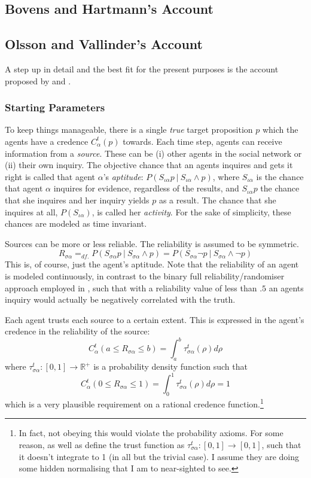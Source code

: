 \documentclass[11pt, a4paper]{scrartcl}
\newcommand{\Ssa}{S_{\sigma\alpha}}
\newcommand{\sa}{{\sigma\alpha}}
\newcommand{\given}[1][]{\:#1\vert\:}
\renewcommand{\i}[1]{\emph{#1}}
\begin{document}
\subsection{Bovens and Hartmann's Account}


\subsection{Olsson and Vallinder's Account}

A step up in detail and the best fit for the present purposes is the account proposed by \textcite{Olsson2013} and \textcite{Angere2010}.

\subsubsection{Starting Parameters}

To keep things manageable, there is a single \i{true} target proposition $p$ which the agents have a credence $C^t_\alpha(p)$ towards. Each time step, agents can receive information from a \i{source}. These can be (i) other agents in the social network or (ii) their own inquiry. The objective chance that an agents inquires and gets it right is called that agent $\alpha$'s \i{aptitude}: $P(S_{\iota \alpha}p \given S_{\iota \alpha} \land p)$, where $S_{\iota \alpha}$ is the chance that agent $\alpha$ inquires for evidence, regardless of the results, and $S_{\iota \alpha} p$ the chance that she inquires and her inquiry yields $p$ as a result. The chance that she inquires at all, $P(S_{\iota \alpha})$, is called her \i{activity}. For the sake of simplicity, these chances are modeled as time invariant.

Sources can be more or less reliable. The reliability is assumed to be symmetric.
\[ 
R_{\sigma \alpha} =_{df.} P(\Ssa p \given \Ssa \land p) = P(\Ssa \neg p \given \Ssa \land \neg p)
\]
This is, of course, just the agent's aptitude. Note that the reliability of an agent is modeled continuously, in contrast to the binary full reliability/randomiser approach employed in \textcite[Chp. 3]{Bovens2003}, such that with a reliability value of less than $.5$ an agents inquiry would actually be negatively correlated with the truth.

Each agent trusts each source to a certain extent. This is expressed in the agent's credence in the reliability of the source:
\[ 
    C^t_{\alpha}(a \leqslant R_{\sa} \leqslant b) = \int_a^b \tau^t_{\sa}(\rho) d\rho
\]
where $\tau^t_{\sa}: [0,1] \rightarrow \mathbb{R}^+$ is a probability density function such that 
\[
    C^t_{\alpha}(0 \leqslant R_{\sa} \leqslant 1) =  \int_0^1 \tau^t_{\sa} (\rho) d\rho = 1
\]which is a very plausible requirement on a rational credence function.\footnote{In fact, not obeying this would violate the probability axioms. For some reason, \textcite{Angere2010} as well as \textcite{Olsson2013} define the trust function as $\tau^t_{\sa}: [0,1] \rightarrow [0,1]$, such that it doesn't integrate to 1 (in all but the trivial case). I assume they are doing some hidden normalising that I am to near-sighted to see.}
\end{document}
